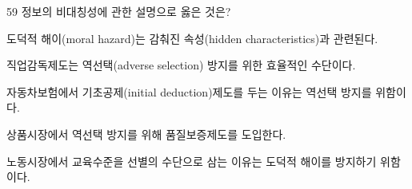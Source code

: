 \begin{question}{59}
정보의 비대칭성에 관한 설명으로 옳은 것은?
\begin{choices}
  \item 도덕적 해이(moral hazard)는 감춰진 속성(hidden characteristics)과 관련된다.
  \item 직업감독제도는 역선택(adverse selection) 방지를 위한 효율적인 수단이다.
  \item 자동차보험에서 기초공제(initial deduction)제도를 두는 이유는 역선택 방지를 위함이다.
  \item 상품시장에서 역선택 방지를 위해 품질보증제도를 도입한다.
  \item 노동시장에서 교육수준을 선별의 수단으로 삼는 이유는 도덕적 해이를 방지하기 위함이다.
\end{choices}
\end{question}
